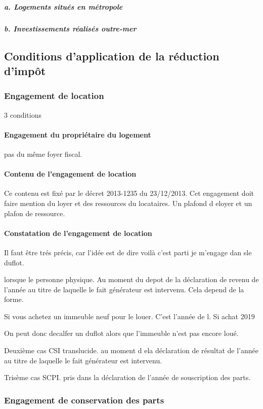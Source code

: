 				\subparagraph{a. Logements situés en métropole}

				\subparagraph{b. Investissements réalisés outre-mer}


	\subsection{Conditions d’application de la réduction d’impôt}

		\subsubsection{Engagement de location}

			3 conditions

			\paragraph{Engagement du propriétaire du logement} pas du même foyer fiscal.

			\paragraph{Contenu de l'engagement de location} Ce contenu est fixé par le décret 2013-1235 du 23/12/2013. Cet engagement doit faire mention du loyer et des ressources du locataires. Un plafond d eloyer et un plafon de ressource.

			\paragraph{Constatation de l'engagement de location} Il faut être trés précis, car l'idée est de dire voilà c'est parti je m'engage dan sle duflot.

			lorsque le personne physique. Au moment du depot de la déclaration de revenu de l'année au titre de laquelle le fait générateur est intervenu. Cela depend de la forme.

			Si vous achetez un immeuble neuf pour le louer. C'est l'année de l. Si achat 2019

			On peut donc decalfer un duflot alors que l'immeuble n'est pas encore loué.

			Deuxième cas CSI translucide. au moment d ela déclaration de résultat de l'année au titre de laquelle le fait générateur est intervenu.

			Trisème cas SCPI. pris dans la déclaration de l'année de souscription des parts.


		\subsubsection{Engagement de conservation des parts}

